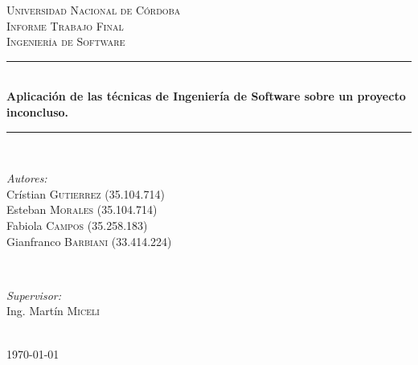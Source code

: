 \documentclass[10pt]{article} %
\begin{document}

\begin{titlepage}

\newcommand{\HRule}{\rule{\linewidth}{0.5mm}} %

\center %

\textsc{\LARGE Universidad Nacional de Córdoba}\\[1.5cm] %
\textsc{\Large Informe Trabajo Final}\\[0.5cm] %
\textsc{\large Ingeniería de Software}\\[0.5cm] %

\HRule \\[0.4cm]
\Large{ \huge \bfseries Aplicación de las técnicas de Ingeniería de Software sobre un proyecto inconcluso.}\par %
\HRule \\[1.5cm]

\begin{minipage}{0.5\textwidth}
\begin{flushleft} \large
\emph{Autores:}\\
Crístian \textsc{Gutierrez} (35.104.714)\\
Esteban \textsc{Morales} (35.104.714)\\
Fabiola \textsc{Campos} (35.258.183)\\
Gianfranco \textsc{Barbiani} (33.414.224)\\
\end{flushleft}
\end{minipage}
~
\begin{minipage}{0.4\textwidth}
\begin{flushright} \large
\emph{Supervisor:} \\
Ing. Martín \textsc{Miceli}
\end{flushright}
\end{minipage}\\[4cm]

{\large \today}\\[3cm] %


\vfill %
\restoregeometry
\end{titlepage}
\end{document}
